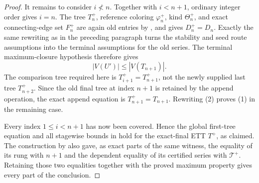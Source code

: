 \begin{proof}
It remains to consider \(i\not<n\).  Together with \(i<n+1\), ordinary
integer order gives \(i=n\).  The tree \(T_n^+\), reference coloring
\(\varphi_n^+\), kind \(\Theta_n^+\), and exact connecting-edge set
\(F_n^+\) are again old entries by
, and
 gives \(D_n^+=D_n\).  Exactly the
same rewriting as in the preceding paragraph turns the stability and seed
route assumptions into the terminal assumptions for the old series.
The terminal maximum-closure hypothesis
 therefore gives
\[
                         |V(U')|\leq |V(T_{n+1})|.         \tag{2}
\]
The comparison tree required here is \(T_{i+1}^+=T_{n+1}^+\), not the
newly supplied last tree \(T_{n+2}^+\).  Since the old final tree at index
\(n+1\) is retained by the append operation, the exact append equation is
\(T_{n+1}^+=T_{n+1}\).  Rewriting (2) proves (1) in the remaining case.

Every index \(1\leq i<n+1\) has now been covered.  Hence the global
first-tree equation and all stagewise bounds in
 hold for the exact-final ETT \(T^+\), as
claimed.  The construction by
 also gave, as exact parts of the
same witness, the equality of its rung with \(n+1\) and the dependent
equality of its certified series with \(\mathcal T^+\).  Retaining those
two equalities together with the proved maximum property gives every part
of the conclusion.
\end{proof}
